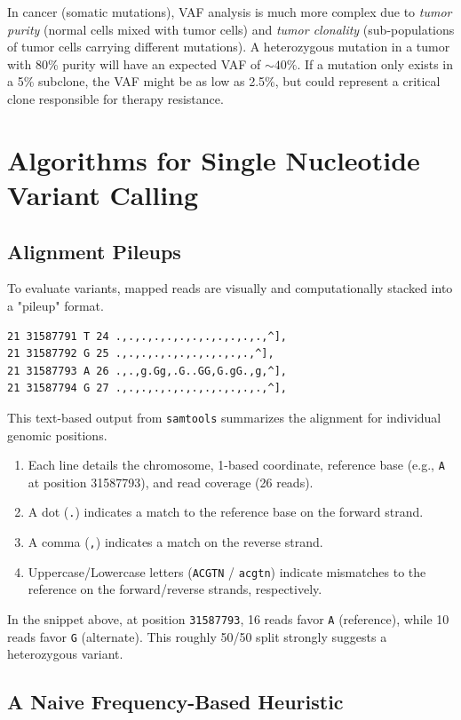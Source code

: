 \sta In cancer (somatic mutations), VAF analysis is much more complex due to \textit{tumor purity} (normal cells mixed with tumor cells) and \textit{tumor clonality} (sub-populations of tumor cells carrying different mutations). A heterozygous mutation in a tumor with 80\% purity will have an expected VAF of $\sim 40\%$. If a mutation only exists in a 5\% subclone, the VAF might be as low as 2.5\%, but could represent a critical clone responsible for therapy resistance.

\section{Algorithms for Single Nucleotide Variant Calling}

\subsection{Alignment Pileups}
To evaluate variants, mapped reads are visually and computationally stacked into a "pileup" format. 

\begin{verbatim}
21 31587791 T 24 .,.,.,.,.,.,.,.,.,.,.,.,^],
21 31587792 G 25 .,.,.,.,.,.,.,.,.,.,.,^],
21 31587793 A 26 .,.,g.Gg,.G..GG,G.gG.,g,^],
21 31587794 G 27 .,.,.,.,.,.,.,.,.,.,.,.,^],
\end{verbatim}

This text-based output from \texttt{samtools} summarizes the alignment for individual genomic positions. 
\begin{enumerate}
    \item Each line details the chromosome, 1-based coordinate, reference base (e.g., \texttt{A} at position 31587793), and read coverage (26 reads).
    \item A dot (\texttt{.}) indicates a match to the reference base on the forward strand.
    \item A comma (\texttt{,}) indicates a match on the reverse strand.
    \item Uppercase/Lowercase letters (\texttt{ACGTN} / \texttt{acgtn}) indicate mismatches to the reference on the forward/reverse strands, respectively.
\end{enumerate}

In the snippet above, at position \texttt{31587793}, 16 reads favor \texttt{A} (reference), while 10 reads favor \texttt{G} (alternate). This roughly 50/50 split strongly suggests a heterozygous variant.

\subsection{A Naive Frequency-Based Heuristic}

